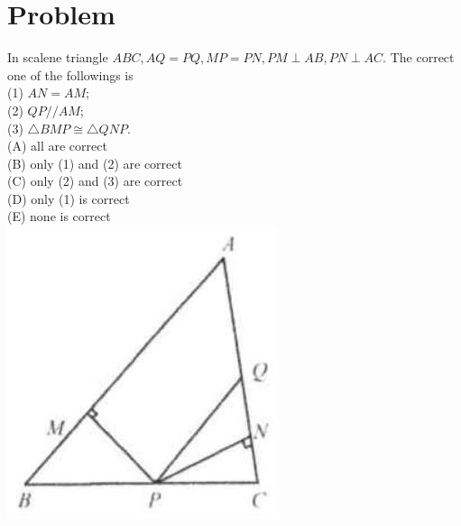 \documentclass{article}
\begin{document}
\section*{Problem}
In scalene triangle \(A B C, A Q=P Q, M P=P N, P M \perp A B, P N \perp A C\). The correct one of the followings is\\
(1) \(A N=A M\);\\
(2) \(Q P / / A M\);\\
(3) \(\triangle B M P \cong \triangle Q N P\).\\
(A) all are correct\\
(B) only (1) and (2) are correct\\
(C) only (2) and (3) are correct\\
(D) only (1) is correct\\
(E) none is correct\\
\centering
\includegraphics[width=\textwidth]{images/064(3).jpg}
\end{document}
